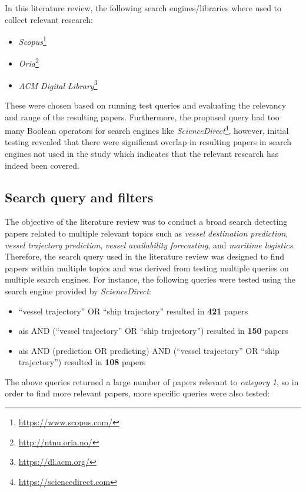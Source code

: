 In this literature review, the following search engines/libraries where used to collect relevant research:

\begin{itemize}
    \item \textit{Scopus}\footnote{\url{https://www.scopus.com/}}
    \item \textit{Oria}\footnote{\url{http://ntnu.oria.no/}}
    \item \textit{ACM Digital Library}\footnote{\url{https://dl.acm.org/}}
\end{itemize}

These were chosen based on running test queries and evaluating the relevancy and range of the resulting papers. Furthermore, the proposed query had too many Boolean operators for search engines like \textit{ScienceDirect}\footnote{\url{https://sciencedirect.com}}, however, initial testing revealed that there were significant overlap in resulting papers in search engines not used in the study which indicates that the relevant research has indeed been covered.

\subsection{Search query and filters}

The objective of the literature review was to conduct a broad search detecting papers related to multiple relevant topics such as \textit{vessel destination prediction}, \textit{vessel trajectory prediction}, \textit{vessel availability forecasting}, and \textit{maritime logistics}. Therefore, the search query used in the literature review was designed to find papers within multiple topics and was derived from testing multiple queries on multiple search engines. For instance, the following queries were tested using the search engine provided by \textit{ScienceDirect}:

\begin{itemize}
    \item ``vessel trajectory'' OR ``ship trajectory'' resulted in \textbf{421} papers
    \item ais AND (``vessel trajectory'' OR ``ship trajectory'') resulted in \textbf{150} papers
    \item ais AND (prediction OR predicting) AND (``vessel trajectory'' OR ``ship trajectory'') resulted in \textbf{108} papers
\end{itemize}

The above queries returned a large number of papers relevant to \textit{category 1}, so in order to find more relevant papers, more specific queries were also tested:

